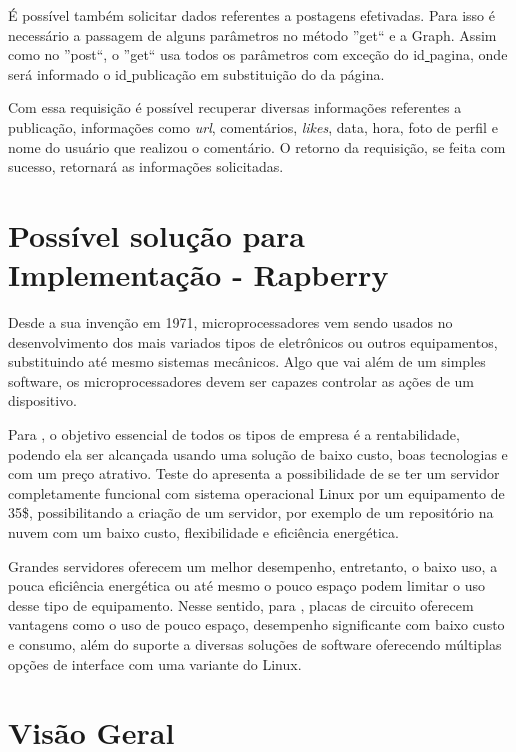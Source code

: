 É possível também solicitar dados referentes a postagens efetivadas. Para isso é necessário a passagem de alguns parâmetros no método ''get`` e a Graph. Assim como no ''post``, o ''get`` usa todos os parâmetros com exceção do id\underline{{ }}pagina, onde será informado o id\underline{{ }}publicação em substituição do da página.

Com essa requisição é possível recuperar diversas informações referentes a publicação, informações como \textit{url}, comentários, \textit{likes}, data, hora, foto de perfil e nome do usuário que realizou o comentário. O retorno da requisição, se feita com sucesso, retornará as informações solicitadas.
 

\section{Possível solução para Implementação - Rapberry}
Desde a sua invenção em 1971, microprocessadores vem sendo usados no desenvolvimento dos mais variados tipos de eletrônicos ou outros equipamentos, substituindo até mesmo sistemas mecânicos. Algo que vai além de um simples software, os microprocessadores devem ser capazes controlar as ações de um dispositivo. \cite{rosenstark2007}

Para \cite{aristotelous2016}, o objetivo essencial de todos os tipos de empresa é a rentabilidade, podendo ela ser alcançada usando uma solução de baixo custo, boas tecnologias e com um preço atrativo. Teste do \cite{aristotelous2016} apresenta a possibilidade de se ter um servidor completamente funcional com sistema operacional Linux por um equipamento de 35\$, possibilitando a criação de um servidor, por exemplo de um repositório na nuvem com um baixo custo, flexibilidade e eficiência energética. 

Grandes servidores oferecem um melhor desempenho, entretanto, o baixo uso, a pouca eficiência energética ou até mesmo o pouco espaço podem limitar o uso desse tipo de equipamento. Nesse sentido, para \cite{cusick2014}, placas de circuito oferecem vantagens como o uso de pouco espaço, desempenho significante com baixo custo e consumo, além do suporte a diversas soluções de software oferecendo múltiplas opções de interface com uma variante do Linux. 

\section{Visão Geral}

